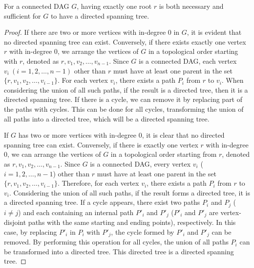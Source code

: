\documentclass[runningheads]{llncs}
\theoremstyle{plain}
\theoremstyle{definition}
\begin{document}
\begin{lemma}\label{lemma_spanning}
    For a connected DAG $G$, having exactly one root $r$ is both necessary and sufficient for $G$ to have a directed spanning tree.
\end{lemma}

\begin{proof}
    If there are two or more vertices with in-degree 0 in $G$, it is evident that no directed spanning tree can exist. Conversely, if there exists exactly one vertex $r$ with in-degree 0, we arrange the vertices of $G$ in a topological order starting with $r$, denoted as $r, v_1, v_2, \dots, v_{n-1}$. Since $G$ is a connected DAG, each vertex $v_i\ (i=1, 2, \dots, n-1)$ other than $r$ must have at least one parent in the set $\{r, v_1, v_2, \dots, v_{i-1}\}$. For each vertex $v_i$, there exists a path $P_i$ from $r$ to $v_i$. When considering the union of all such paths, if the result is a directed tree, then it is a directed spanning tree. If there is a cycle, we can remove it by replacing part of the paths with cycles. This can be done for all cycles, transforming the union of all paths into a directed tree, which will be a directed spanning tree.

    If \( G \) has two or more vertices with in-degree 0, it is clear that no directed spanning tree can exist. Conversely, if there is exactly one vertex \( r \) with in-degree 0, we can arrange the vertices of \( G \) in a topological order starting from \( r \), denoted as \( r, v_1, v_2, \dots, v_{n-1} \). Since \( G \) is a connected DAG, every vertex \( v_i \) (\( i = 1, 2, \dots, n-1 \)) other than \( r \) must have at least one parent in the set \( \{ r, v_1, v_2, \dots, v_{i-1} \} \). Therefore, for each vertex \( v_i \), there exists a path \( P_i \) from \( r \) to \( v_i \). Considering the union of all such paths, if the result forms a directed tree, it is a directed spanning tree. If a cycle appears, there exist two paths \( P_i \) and \( P_j \) (\( i \neq j \)) and each containing an internal path $P'_i$ and $P'_j$ (\( P'_i \) and \( P'_j \) are vertex-disjoint paths with the same starting and ending points), respectively. In this case, by replacing \( P'_i \) in \( P_i \) with \( P'_j \), the cycle formed by \( P'_i \) and \( P'_j \) can be removed. By performing this operation for all cycles, the union of all paths \( P_i \) can be transformed into a directed tree. This directed tree is a directed spanning tree.

\end{proof}
\end{document}

